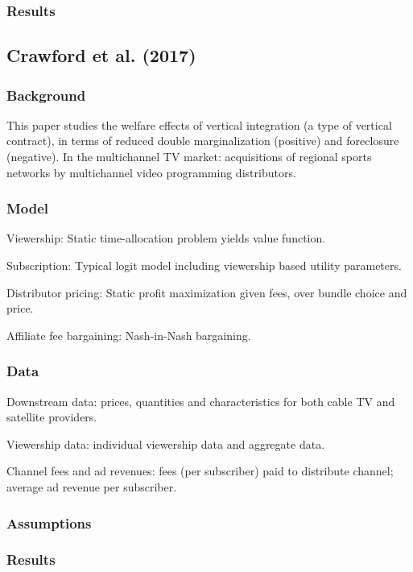 \subsubsection{Results}



\newpage
\subsection{Crawford et al. (2017)}

\subsubsection{Background}

This paper studies the welfare effects of vertical integration (a type of vertical contract), in terms of reduced double marginalization (positive) and foreclosure (negative). In the multichannel TV market: acquisitions of regional sports networks by multichannel video programming distributors.

\subsubsection{Model}

Viewership: Static time-allocation problem yields value function.

Subscription: Typical logit model including viewership based utility parameters.

Distributor pricing: Static profit maximization given fees, over bundle choice and price.

Affiliate fee bargaining: Nash-in-Nash bargaining.

\subsubsection{Data}

Downstream data: prices, quantities and characteristics for both cable TV and satellite providers.

Viewership data: individual viewership data and aggregate data.

Channel fees and ad revenues: fees (per subscriber) paid to distribute channel; average ad revenue per subscriber.

\subsubsection{Assumptions}



\subsubsection{Results}

